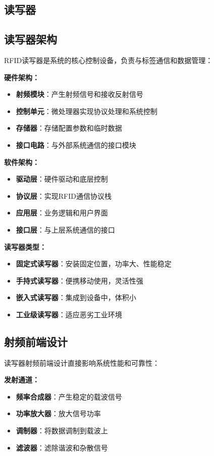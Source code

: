 \documentclass[12pt,UTF8]{ctexbook}
\begin{document}
\begin{itemize}[leftmargin=3.5em]
\begin{itemize}[leftmargin=3.5em]
\chapter{读写器}

\section{读写器架构}

RFID读写器是系统的核心控制设备，负责与标签通信和数据管理：

\textbf{硬件架构：}
\begin{itemize}[leftmargin=3.5em]
    \item \textbf{射频模块}：产生射频信号和接收反射信号
    \item \textbf{控制单元}：微处理器实现协议处理和系统控制
    \item \textbf{存储器}：存储配置参数和临时数据
    \item \textbf{接口电路}：与外部系统通信的接口模块
\end{itemize}

\textbf{软件架构：}
\begin{itemize}[leftmargin=3.5em]
    \item \textbf{驱动层}：硬件驱动和底层控制
    \item \textbf{协议层}：实现RFID通信协议栈
    \item \textbf{应用层}：业务逻辑和用户界面
    \item \textbf{接口层}：与上层系统通信的接口
\end{itemize}

\textbf{读写器类型：}
\begin{itemize}[leftmargin=3.5em]
    \item \textbf{固定式读写器}：安装固定位置，功率大、性能稳定
    \item \textbf{手持式读写器}：便携移动使用，灵活性强
    \item \textbf{嵌入式读写器}：集成到设备中，体积小
    \item \textbf{工业级读写器}：适应恶劣工业环境
\end{itemize}

\section{射频前端设计}

读写器射频前端设计直接影响系统性能和可靠性：

\textbf{发射通道：}
\begin{itemize}[leftmargin=3.5em]
    \item \textbf{频率合成器}：产生稳定的载波信号
    \item \textbf{功率放大器}：放大信号功率
    \item \textbf{调制器}：将数据调制到载波上
    \item \textbf{滤波器}：滤除谐波和杂散信号
\end{itemize}


\end{itemize}
\end{itemize}
\end{document}
